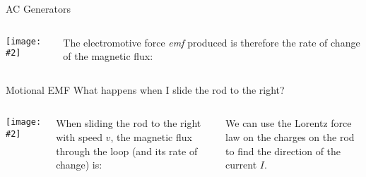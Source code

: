\documentclass[12pt,aspectratio=169]{beamer}
\newcommand{\pic}[2]{\texttt{[image: \#2]}}
\newcommand{\eq}[2]{\vspace{#1}{\Large\begin{displaymath}#2\end{displaymath}}}
\begin{document}
\begin{frame}{AC Generators}
  \begin{columns}
    \pic{1.05}{generator}

    The electromotive force \emph{emf} produced is therefore the rate of change
    of the magnetic flux:

  \end{columns}
\end{frame}



%
%    
%    
%



\begin{frame}{Motional EMF}
  {What happens when I slide the rod to the right?}
  \begin{columns}
    \pic{1}{motional-emf-1}

    When sliding the rod to the right with speed $v$, the magnetic flux through
    the loop (and its rate of change) is:

    
    We can use the Lorentz force law on the charges on the rod to find the
    direction of the current $I$.
  \end{columns}
\end{frame}
\end{document}
